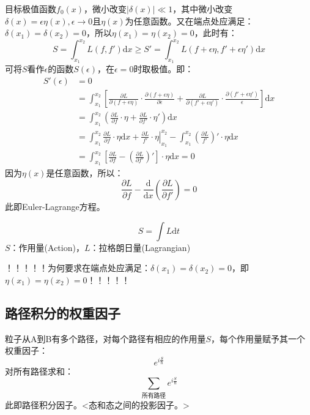 目标极值函数$f_0(x)$，微小改变$|\delta(x)|\ll1$，其中微小改变$\delta(x) = \epsilon \eta(x),\epsilon\rightarrow0$且$\eta(x)$为任意函数。又在端点处应满足：$\delta(x_1) = \delta(x_2) = 0$，所以$\eta(x_1) = \eta (x_2) = 0$，此时有：
\begin{equation}
S = \int_{x_1}^{x_2}L(f,f')\mathrm{d}x \ge S' = \int_{x_1}^{x_2}L(f+\epsilon\eta,f'+\epsilon\eta')\mathrm{d}x
\end{equation}
可将$S$看作$\epsilon$的函数$S(\epsilon)$，在$\epsilon=0$时取极值。即：
\begin{align*}
S'(\epsilon) &= 0\\
             &= \int_{x_1}^{x_2} \left[ \frac{\partial L}{\partial(f+\epsilon\eta)} \cdot \frac{\partial(f+\epsilon\eta)}{\partial\epsilon} + \frac{\partial L}{\partial(f'+\epsilon\eta')} \cdot \frac{\partial(f'+\epsilon\eta')}{\epsilon} \right] \mathrm{d}x\\
             &= \int_{x_1}^{x_2} \left( \frac{\partial L}{\partial f} \cdot \eta + \frac{\partial L}{\partial f'} \cdot \eta' \right)\mathrm{d}x\\
             &= \int_{x_1}^{x_2}  \frac{\partial L}{\partial f} \cdot \eta \mathrm{d}x + \left. \frac{\partial L}{f'} \cdot \eta \right|_{x_1}^{x_2} - \int_{x_1}^{x_2} \left(\frac{\partial L}{f'}\right)'\cdot \eta \mathrm{d}x\\
             &= \int_{x_1}^{x_2} \left[ \frac{\partial L}{\partial f} - \left(\frac{\partial L}{\partial f'}\right)' \right] \cdot \eta \mathrm{d}x = 0
\end{align*}
因为$\eta(x)$是任意函数，所以：
\begin{equation}
\frac{\partial L}{\partial f} - \frac{\mathrm{d}}{\mathrm{d}x}\left(\frac{\partial L}{\partial f'}\right) = 0
\end{equation}
此即Euler-Lagrange方程。

\[S = \int L \mathrm{d}t\]
$S$：作用量(Action)，$L$：拉格朗日量(Lagrangian)

！！！！！为何要求在端点处应满足：$\delta(x_1) = \delta(x_2) = 0$，即$\eta(x_1) = \eta (x_2) = 0$！！！！！

\subsection{路径积分的权重因子}

粒子从A到B有多个路径，对每个路径有相应的作用量$S$，每个作用量赋予其一个权重因子：
\[e^{i\frac{S}{\hbar}}\]
对所有路径求和：
\[\sum_{\text{所有路径}}e^{i\frac{S}{\hbar}}\]
此即路径积分因子。<态和态之间的投影因子。>

